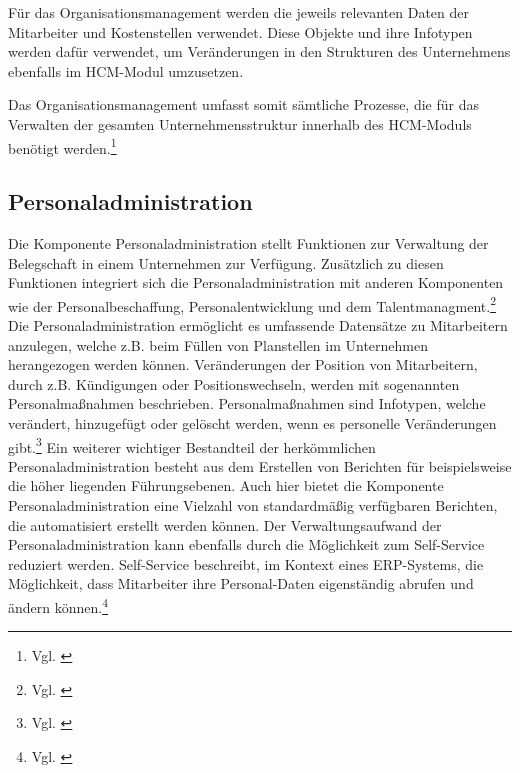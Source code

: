 Für das Organisationsmanagement werden die jeweils relevanten Daten der Mitarbeiter und Kostenstellen verwendet. 
Diese Objekte und ihre Infotypen werden dafür verwendet, um Veränderungen in den Strukturen des Unternehmens ebenfalls im HCM-Modul umzusetzen.

Das Organisationsmanagement umfasst somit sämtliche Prozesse, die für das Verwalten der gesamten Unternehmensstruktur innerhalb des HCM-Moduls benötigt werden.\footnote{Vgl. \cite{SAPSE2024a}}

\subsection{Personaladministration}
Die Komponente Personaladministration stellt Funktionen zur Verwaltung der Belegschaft in einem Unternehmen zur Verfügung. 
Zusätzlich zu diesen Funktionen integriert sich die Personaladministration mit anderen Komponenten wie der Personalbeschaffung, Personalentwicklung und dem Talentmanagment.\footnote{Vgl. \cite{SAPSE2022}}
Die Personaladministration ermöglicht es umfassende Datensätze zu Mitarbeitern anzulegen, welche z.B. beim Füllen von Planstellen im Unternehmen herangezogen werden können. Veränderungen
der Position von Mitarbeitern, durch z.B. Kündigungen oder Positionswechseln, werden mit sogenannten Personalmaßnahmen beschrieben. 
Personalmaßnahmen sind Infotypen, welche verändert, hinzugefügt oder gelöscht werden, wenn es personelle Veränderungen gibt.\footnote{Vgl. \cite{SAPSE2023a}}
Ein weiterer wichtiger Bestandteil der herkömmlichen Personaladministration besteht aus dem Erstellen von Berichten für beispielsweise die höher liegenden Führungsebenen. 
Auch hier bietet die Komponente Personaladministration eine Vielzahl von standardmäßig verfügbaren Berichten, die automatisiert erstellt werden können.
Der Verwaltungsaufwand der Personaladministration kann ebenfalls durch die Möglichkeit zum Self-Service reduziert werden. 
Self-Service beschreibt, im Kontext eines ERP-Systems, die Möglichkeit, dass Mitarbeiter ihre Personal-Daten eigenständig abrufen und ändern können.\footnote{Vgl. \cite{SAPSE2023}}

